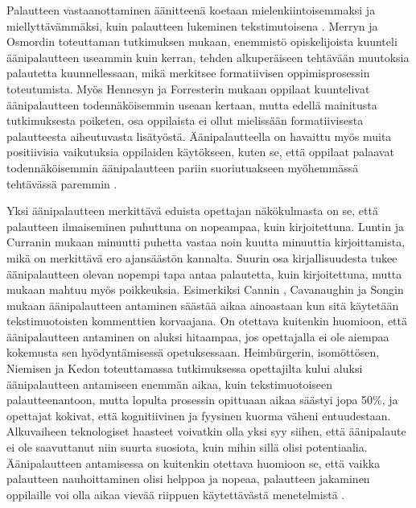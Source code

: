 \documentclass[utf8]{gradu3}
\begin{document}
Palautteen vastaanottaminen äänitteenä koetaan mielenkiintoisemmaksi ja miellyttävämmäksi, kuin palautteen lukeminen tekstimutoisena \parencite[][]{listenOrToRead}. Merryn ja Osmordin \parencite*[][]{attitudes} toteuttaman tutkimuksen mukaan, enemmistö opiskelijoista kuunteli äänipalautteen useammin kuin kerran, tehden alkuperäiseen tehtävään muutoksia palautetta kuunnellessaan, mikä merkitsee formatiivisen oppimisprosessin toteutumista. Myös Hennesyn ja Forresterin \parencite*[][]{attitudes} mukaan oppilaat kuuntelivat äänipalautteen todennäköisemmin useaan kertaan, mutta edellä mainitusta tutkimuksesta poiketen, osa oppilaista ei ollut mielissään formatiivisesta palautteesta aiheutuvasta lisätyöstä. Äänipalautteella on havaittu myös muita positiivisia vaikutuksia oppilaiden käytökseen, kuten se, että oppilaat palaavat todennäköisemmin äänipalautteen pariin suoriutuakseen myöhemmässä tehtävässä paremmin \parencite[][]{voice}.

Yksi äänipalautteen merkittävä eduista opettajan näkökulmasta on se, että palautteen ilmaiseminen puhuttuna on nopeampaa, kuin kirjoitettuna. Luntin ja Curranin \parencite[][]{areYouListening} mukaan minuutti puhetta vastaa noin kuutta minuuttia kirjoittamista, mikä on merkittävä ero ajansäästön kannalta. Suurin osa kirjallisuudesta tukee äänipalautteen olevan nopempi tapa antaa palautetta, kuin kirjoitettuna, mutta mukaan mahtuu myös poikkeuksia. Esimerkiksi Cannin \parencite[][]{engaging}, Cavanaughin ja Songin \parencite[][]{versus} mukaan äänipalautteen antaminen säästää aikaa ainoastaan kun sitä käytetään tekstimuotoisten kommenttien korvaajana. On otettava kuitenkin huomioon, että äänipalautteen antaminen on aluksi hitaampaa, jos opettajalla ei ole aiempaa kokemusta sen hyödyntämisessä opetuksessaan. Heimbürgerin, isomöttösen, Niemisen ja Kedon \parencite[][]{academics} toteuttamassa tutkimuksessa opettajilta kului aluksi äänipalautteen antamiseen enemmän aikaa, kuin tekstimuotoiseen palautteenantoon, mutta lopulta prosessin opittuaan aikaa säästyi jopa 50\%, ja opettajat kokivat, että kognitiivinen ja fyysinen kuorma väheni entuudestaan. Alkuvaiheen teknologiset haasteet voivatkin olla yksi syy siihen, että äänipalaute ei ole saavuttanut niin suurta suosiota, kuin mihin sillä olisi potentiaalia. Äänipalautteen antamisessa on kuitenkin otettava huomioon se, että vaikka palautteen nauhoittaminen olisi helppoa ja nopeaa, palautteen jakaminen oppilaille voi olla aikaa vievää riippuen käytettävästä menetelmistä \parencite[][]{engaging}.
\end{document}
